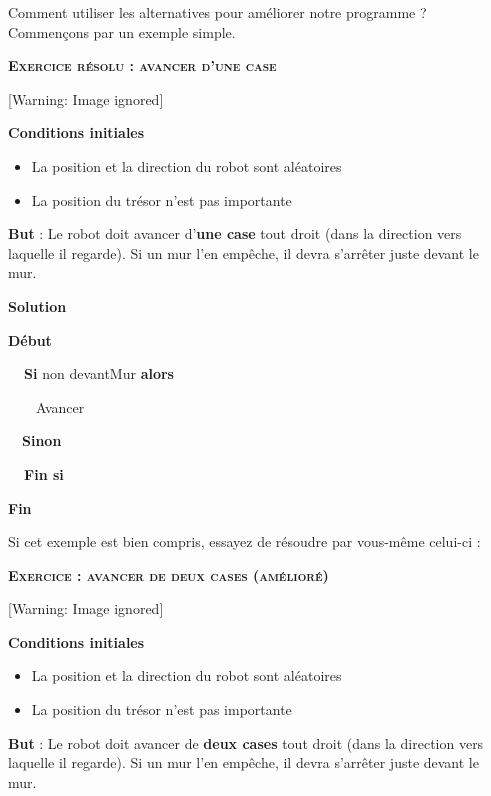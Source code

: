 {
Comment utiliser les alternatives pour améliorer notre programme ?
Commençons par un exemple simple.}

{\sffamily\bfseries\scshape
Exercice résolu : avancer d'une case }

\begin{center}
 [Warning: Image ignored] %

\end{center}
{\bfseries
Conditions initiales}

\liststyleListv
\begin{itemize}
\item {
La position et la direction du robot sont aléatoires}
\item {
La position du trésor n'est pas importante}
\end{itemize}
{
\textbf{But} : Le robot doit avancer d'\textbf{une
case} tout droit (dans la direction vers laquelle il regarde). Si un
mur l'en empêche, il devra s'arrêter
juste devant le mur.}

{\bfseries
Solution}

{\sffamily\bfseries
Début}

{\sffamily
\textbf{\ \ Si} non devantMur \textbf{alors}}

{\sffamily
\ \ \ \ Avancer}

{\sffamily
\ \ \textbf{Sinon}}

{\sffamily\bfseries
\ \ Fin si}

{\sffamily\bfseries
Fin}

{
Si cet exemple est bien compris, essayez de résoudre par vous-même
celui-ci :}

{\sffamily\bfseries\scshape
Exercice : avancer de deux cases (amélioré)}

\begin{center}
 [Warning: Image ignored] %

\end{center}
{\bfseries
Conditions initiales}

\liststyleListv
\begin{itemize}
\item {
La position et la direction du robot sont aléatoires}
\item {
La position du trésor n'est pas importante}
\end{itemize}
{
\textbf{But} : Le robot doit avancer de \textbf{deux cases} tout droit
(dans la direction vers laquelle il regarde). Si un mur
l'en empêche, il devra s'arrêter
juste devant le mur.}


